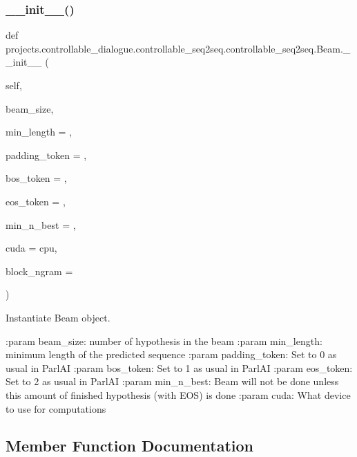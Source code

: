 \subsubsection{\texorpdfstring{\+\_\+\+\_\+init\+\_\+\+\_\+()}{\_\_init\_\_()}}
{\footnotesize\ttfamily def projects.\+controllable\+\_\+dialogue.\+controllable\+\_\+seq2seq.\+controllable\+\_\+seq2seq.\+Beam.\+\_\+\+\_\+init\+\_\+\+\_\+ (\begin{DoxyParamCaption}\item[{}]{self,  }\item[{}]{beam\+\_\+size,  }\item[{}]{min\+\_\+length = {},  }\item[{}]{padding\+\_\+token = {},  }\item[{}]{bos\+\_\+token = {},  }\item[{}]{eos\+\_\+token = {},  }\item[{}]{min\+\_\+n\+\_\+best = {},  }\item[{}]{cuda = {\ttfamily \textquotesingle{}cpu\textquotesingle{}},  }\item[{}]{block\+\_\+ngram = {} }\end{DoxyParamCaption})}

\begin{DoxyVerb}Instantiate Beam object.

:param beam_size:
    number of hypothesis in the beam
:param min_length:
    minimum length of the predicted sequence
:param padding_token:
    Set to 0 as usual in ParlAI
:param bos_token:
    Set to 1 as usual in ParlAI
:param eos_token:
    Set to 2 as usual in ParlAI
:param min_n_best:
    Beam will not be done unless this amount of finished hypothesis
    (with EOS) is done
:param cuda:
    What device to use for computations
\end{DoxyVerb}
 

\subsection{Member Function Documentation}
\mbox{\label{classprojects_1_1controllable__dialogue_1_1controllable__seq2seq_1_1controllable__seq2seq_1_1Beam_ae605905ec50225724e1b54e557009539}} 
